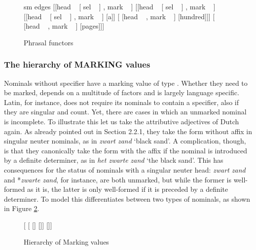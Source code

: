 \documentclass[output=paper]{langsci/langscibook}
\begin{document}
\begin{figure}
	\centering
	\begin{forest}
sm edges
[{[{\sc head} ~  [ {\sc sel} ~ ] , {\sc mark} ~ ]}
	[{[{\sc head} ~  [ {\sc sel} ~ ] , {\sc mark} ~ ]}
		[{[{\sc head} ~ [ {\sc sel} ~ ] , {\sc mark} ~  ]} [a]]
		[{ [{\sc head} ~  , {\sc mark} ~ ]} [hundred]]]
	[{ [{\sc head} ~  , {\sc mark} ~ ]} [pages]]]
	\end{forest}
	\caption{\label{glorie} Phrasal functors }
\end{figure}


\subsubsection{The hierarchy of MARKING values} 
\label{sec-without-spec}

Nominals without specifier have a {\sc marking} value of type . 
Whether they need to be marked, depends on a multitude of factors and is 
largely language specific. 
Latin, for instance, does not require its nominals to contain a specifier, also 
if they are singular and count. Yet, there are cases in which an unmarked nominal 
is incomplete.    
To illustrate this let us take the attributive adjectives of Dutch again. 
As already pointed out in Section 2.2.1, they take the form without affix in  
singular neuter nominals, as in \emph{zwart zand} `black sand'. A complication, 
though, is that they canonically take the form with the affix if the nominal is  
introduced by a definite determiner, as in \emph{het zwarte zand} `the black sand'. 
This has consequences for the status of nominals with a singular neuter head: 
\emph{zwart zand} and *\emph{zwarte zand}, for instance, are both unmarked, 
but while the former is well-formed as it is, the latter is only 
well-formed if it is preceded by a definite determiner. 
To model this \citet{VanEynde06} differentiates between two types 
of  nominals, as shown in Figure \ref{bare}. 

\begin{figure}
	\centering
	\begin{forest}
[
	[\type{unmarked}
		[\type{incomplete}]
		[\type{bare}]]
	[]]		
	\end{forest}
	\caption{\label{bare} Hierarchy of Marking values} 
\end{figure}
\end{document}
